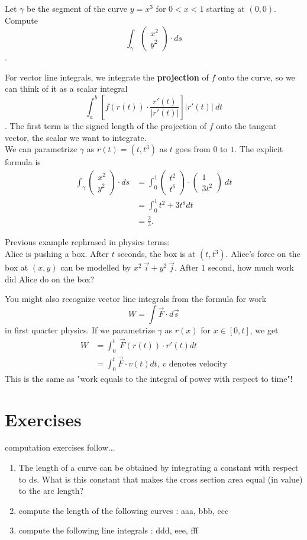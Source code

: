 \documentclass[11pt,openany]{book}
\newcommand*{\exercises}{\section*{\exercisename}}
\newcommand{\exercisename}{Exercises}
\newcommand{\example}[1]{\begin{tcolorbox}[title=Example,colframe=yellow!50!white,colback=yellow!20!white,coltitle=black]{#1}\end{tcolorbox}
}
\begin{document}
	\example{
		Let $\gamma$ be the segment of the curve $y=x^3$ for $0<x<1$ starting at $(0,0)$.
		Compute 
		\[
		\int_{\gamma} \begin{pmatrix}
			x^2 \\ y^2
		\end{pmatrix} \cdot ds
		\]
		.
	}
	For vector line integrals, we integrate the \textbf{projection} of $f$ onto the curve, so we can think of it as a scalar integral \[
		\int_a^b \left[ f(r(t)) \cdot \frac{r'(t)}{|r'(t)|}  \right]   |r'(t)| \ dt
	\]
	. The first term is the signed length of the projection of $f$ onto the tangent vector, the scalar we want to integrate.
	\\
	We can parametrize $\gamma$ as $r(t) = (t,t^3)$ as $t$ goes from $0$ to $1$.
	The explicit formula is \begin{align*}
		\int_{\gamma} \begin{pmatrix}
			x^2 \\ y^2
		\end{pmatrix} \cdot ds &= \int_{0}^1 \begin{pmatrix}
			t^2 \\ t^6
		\end{pmatrix} \cdot  \begin{pmatrix}
			1 \\ 3t^2
		\end{pmatrix} \ dt
		\\
		&= \int_0^1 t^2+3t^8 dt \\
		&= \frac{2}{3}.
	\end{align*}
	\example{
		Previous example rephrased in physics terms:\\
		Alice is pushing a box. After $t$ seconds, the box is at $(t,t^3)$. Alice's force on the box at $(x,y)$ can be modelled by
		$x^2 \ \vec{i} + y^2\ \vec{j}$. After $1$ second, how much work did Alice do on the box?
	}
	You might also recognize vector line integrals from the formula for work \[
	W = \int \vec{F} \cdot d\vec{s} 
	\]
	in first quarter physics. If we parametrize $\gamma$ as ${r}(x)$ for $x \in [0,t]$, we get 
	\begin{align*}
		W &= \int_0^t \ \vec{F}(r(t)) \cdot {r}'(t) dt \\
		&= \int_0^t \vec{F} \cdot v(t) dt \textrm{, $v$ denotes velocity}
	\end{align*}
	This is the same as "work equals to the integral of power with respect to time"!
	
	\exercises
	computation exercises follow...
	\begin{enumerate}
		\item The length of a curve can be obtained by integrating a constant with respect to ds. What is this constant that makes the cross section area equal (in value) to the arc length? 
		\item compute the length of the following curves : aaa, bbb, ccc
		\item compute the following line integrals : ddd, eee, fff
	\end{enumerate}
	
\end{document}
